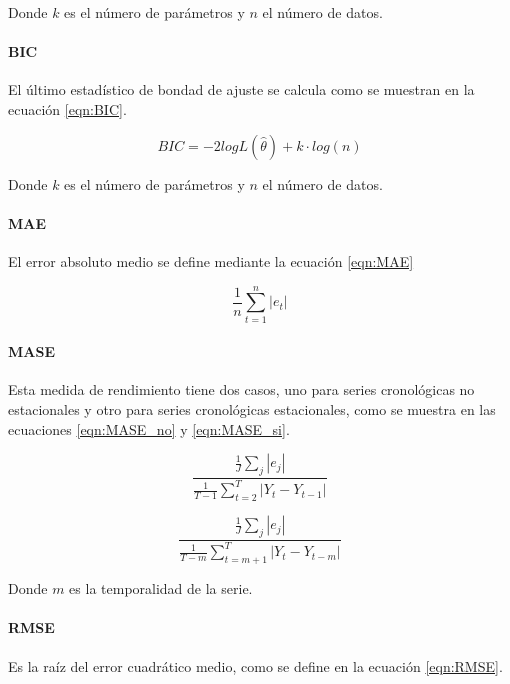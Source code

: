 \documentclass[
]{article}
\begin{document}
Donde \(k\) es el número de parámetros y \(n\) el número de datos.

\paragraph{BIC}

El último estadístico de bondad de ajuste se calcula como se muestran en
la ecuación \eqref{eqn:BIC}.

\begin{equation}
\label{eqn:BIC}
BIC=-2logL\left(\hat\theta\right)+k\cdot log(n)
\end{equation}

Donde \(k\) es el número de parámetros y \(n\) el número de datos.

\paragraph{MAE}

El error absoluto medio se define mediante la ecuación \eqref{eqn:MAE}

\begin{equation}
\label{eqn:MAE}
\frac{1}{n}\sum_{t=1}^n |e_t|
\end{equation}

\paragraph{MASE}

Esta medida de rendimiento tiene dos casos, uno para series cronológicas
no estacionales y otro para series cronológicas estacionales, como se
muestra en las ecuaciones \eqref{eqn:MASE_no} y \eqref{eqn:MASE_si}.

\begin{equation}
\label{eqn:MASE_no}
\frac{\frac{1}{J}\sum_j|e_j|}{\frac{1}{T-1}\sum_{t=2}^T|Y_t-Y_{t-1}|}
\end{equation}

\begin{equation}
\label{eqn:MASE_si}
\frac{\frac{1}{J}\sum_j|e_j|}{\frac{1}{T-m}\sum_{t=m+1}^T|Y_t-Y_{t-m}|}
\end{equation}

Donde \(m\) es la temporalidad de la serie.

\paragraph{RMSE}

Es la raíz del error cuadrático medio, como se define en la ecuación
\eqref{eqn:RMSE}.
\end{document}
